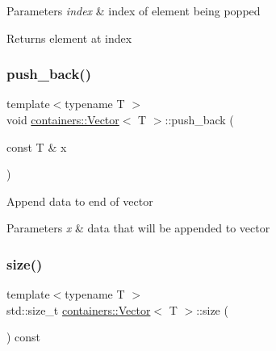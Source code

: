 \begin{DoxyParams}{Parameters}
{\em index} & index of element being popped\\
\hline
\end{DoxyParams}
\begin{DoxyReturn}{Returns}
element at {\ttfamily index} 
\end{DoxyReturn}
\mbox{\label{classcontainers_1_1_vector_ae9ecdc8f09edd4d689b4cb90a05de712}} 
\subsubsection{\texorpdfstring{push\+\_\+back()}{push\_back()}}
{\footnotesize\ttfamily template$<$typename T $>$ \\
void \hyperlink{classcontainers_1_1_vector}{containers\+::\+Vector}$<$ T $>$\+::push\+\_\+back (\begin{DoxyParamCaption}\item[{const T \&}]{x }\end{DoxyParamCaption})\hspace{0.3cm}{\ttfamily [inline]}}

Append data to end of vector


\begin{DoxyParams}{Parameters}
{\em x} & data that will be appended to vector \\
\hline
\end{DoxyParams}
\mbox{\label{classcontainers_1_1_vector_ad93daa14d3585dac313f3bd12d262ba7}} 
\subsubsection{\texorpdfstring{size()}{size()}}
{\footnotesize\ttfamily template$<$typename T $>$ \\
std\+::size\+\_\+t \hyperlink{classcontainers_1_1_vector}{containers\+::\+Vector}$<$ T $>$\+::size (\begin{DoxyParamCaption}{ }\end{DoxyParamCaption}) const\hspace{0.3cm}{\ttfamily [inline]}}

